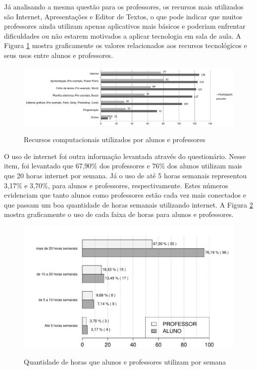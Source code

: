 Já analisando a mesma questão para os professores, os recursos mais utilizados são Internet, Apresentações e Editor de Textos, o que pode indicar que muitos professores ainda utilizam apenas aplicativos mais básicos e poderiam enfrentar dificuldades ou não estarem motivados a aplicar tecnologia em sala de aula. A Figura \ref{fig:grafico_recursos} mostra graficamente os valores relacionados aos recursos tecnológicos e seus usos entre alunos e professores.

\begin{figure}[!h]
\centering
\caption{Recursos computacionais utilizados por alunos e professores}
\includegraphics[width=1.0\textwidth]{pdfs/alunos-professores/recursos-computacionais.pdf} 
\label{fig:grafico_recursos} 
\end{figure}

O uso de internet foi outra informação levantada através do questionário. Nesse item, foi levantado que 67,90\% dos professores e 76\% dos alunos utilizam mais que 20 horas internet por semana. Já o uso de até 5 horas semanais representou 3,17\% e 3,70\%, para alunos e professores, respectivamente. Estes números evidenciam que tanto alunos como professores estão cada vez mais conectados e que passam um boa quantidade de horas semanais utilizando internet. A Figura \ref{fig:grafico_uso_internet} mostra graficamente o uso de cada faixa de horas para alunos e professores.

\begin{figure}[!h]
\centering
\caption{Quantidade de horas que alunos e professores utilizam por semana}
\includegraphics[width=1.0\textwidth]{pdfs/alunos-professores/uso-internet.pdf} 
\label{fig:grafico_uso_internet} 
\end{figure}



